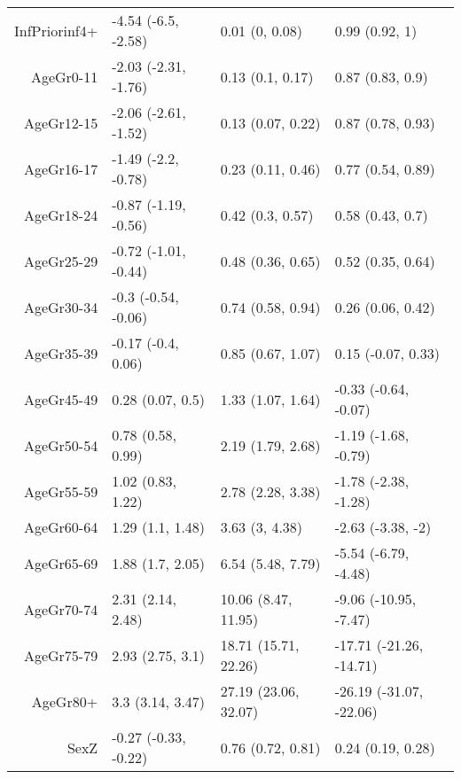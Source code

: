 \begin{table}[ht]
\begin{tabular}{rlll}
  InfPriorinf4+ & -4.54 (-6.5, -2.58) & 0.01 (0, 0.08) & 0.99 (0.92, 1) \\ 
  AgeGr0-11 & -2.03 (-2.31, -1.76) & 0.13 (0.1, 0.17) & 0.87 (0.83, 0.9) \\ 
  AgeGr12-15 & -2.06 (-2.61, -1.52) & 0.13 (0.07, 0.22) & 0.87 (0.78, 0.93) \\ 
  AgeGr16-17 & -1.49 (-2.2, -0.78) & 0.23 (0.11, 0.46) & 0.77 (0.54, 0.89) \\ 
  AgeGr18-24 & -0.87 (-1.19, -0.56) & 0.42 (0.3, 0.57) & 0.58 (0.43, 0.7) \\ 
  AgeGr25-29 & -0.72 (-1.01, -0.44) & 0.48 (0.36, 0.65) & 0.52 (0.35, 0.64) \\ 
  AgeGr30-34 & -0.3 (-0.54, -0.06) & 0.74 (0.58, 0.94) & 0.26 (0.06, 0.42) \\ 
  AgeGr35-39 & -0.17 (-0.4, 0.06) & 0.85 (0.67, 1.07) & 0.15 (-0.07, 0.33) \\ 
  AgeGr45-49 & 0.28 (0.07, 0.5) & 1.33 (1.07, 1.64) & -0.33 (-0.64, -0.07) \\ 
  AgeGr50-54 & 0.78 (0.58, 0.99) & 2.19 (1.79, 2.68) & -1.19 (-1.68, -0.79) \\ 
  AgeGr55-59 & 1.02 (0.83, 1.22) & 2.78 (2.28, 3.38) & -1.78 (-2.38, -1.28) \\ 
  AgeGr60-64 & 1.29 (1.1, 1.48) & 3.63 (3, 4.38) & -2.63 (-3.38, -2) \\ 
  AgeGr65-69 & 1.88 (1.7, 2.05) & 6.54 (5.48, 7.79) & -5.54 (-6.79, -4.48) \\ 
  AgeGr70-74 & 2.31 (2.14, 2.48) & 10.06 (8.47, 11.95) & -9.06 (-10.95, -7.47) \\ 
  AgeGr75-79 & 2.93 (2.75, 3.1) & 18.71 (15.71, 22.26) & -17.71 (-21.26, -14.71) \\ 
  AgeGr80+ & 3.3 (3.14, 3.47) & 27.19 (23.06, 32.07) & -26.19 (-31.07, -22.06) \\ 
  SexZ & -0.27 (-0.33, -0.22) & 0.76 (0.72, 0.81) & 0.24 (0.19, 0.28) \\ 
   \hline
\end{tabular}
\end{table}
